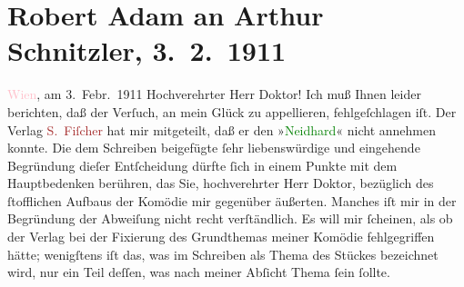 

               \section[Robert Adam an Arthur Schnitzler, 3. 2. 1911]{ Robert Adam an Arthur Schnitzler, 3. 2. 1911}\nopagebreak{}\rehead{ }\normalsize\beginnumbering{} \toendnotes[C]{\smallbreak\pagebreak[2]} 
\toendnotes[C]{\smallbreak}\pstart
           \raggedleft{}{\pb}\textcolor{pink}{Wien}{}\ledrightnote{\textcolor{pink}{Wien}}, am 3. Febr. 1911\pend
           \pstart{}Hochverehrter Herr Doktor!\pend\pstart
           Ich muß Ihnen leider berichten, daß der Verſuch, an mein Glück zu appellieren,
                    fehlgeſchlagen iſt. Der Verlag \textcolor{brown}{S. Fiſcher}{}\ledrightnote{\textcolor{brown}{S. Fischer Verlag}} hat
                    mir mitgeteilt, daß er den »\textcolor{green}{Neidhard}{}\ledrightnote{\textcolor{green}{Neidhard}}« nicht
                    annehmen konnte. Die dem Schreiben beigefügte ſehr liebenswürdige und eingehende
                    Begründung dieſer Entſcheidung dürfte ſich in einem Punkte mit dem Hauptbedenken
                    berühren, das Sie, hochverehrter Herr Doktor, {\pb}bezüglich des ſtofflichen Aufbaus der Komödie mir gegenüber äußerten. Manches
                    iſt mir in der Begründung der Abweiſung nicht recht verſtändlich. Es will mir
                    ſcheinen, als ob der Verlag bei der Fixierung des Grundthemas meiner Komödie
                    fehlgegriffen hätte; wenigſtens iſt das, was im Schreiben als Thema des Stückes
                    bezeichnet wird, nur ein Teil deſſen, was nach meiner Abſicht Thema ſein ſollte.
